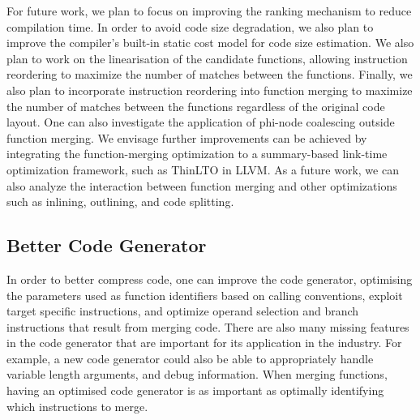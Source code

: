 For future work, we plan to focus on improving the ranking mechanism to reduce compilation time.
In order to avoid code size degradation, we also plan to improve the compiler's built-in static cost model for code size estimation.
We also plan to work on the linearisation of the candidate functions, allowing instruction reordering to maximize the number of matches between the functions.
Finally, we also plan to incorporate instruction reordering into function merging to maximize the number of matches between the functions regardless of the original code layout.
One can also investigate the application of phi-node coalescing outside function merging.
We envisage further improvements can be achieved by integrating the function-merging optimization to a summary-based  link-time optimization framework, such as ThinLTO in LLVM.
As a future work, we can also analyze the interaction between function merging and other optimizations such as inlining, outlining, and code splitting.

\subsection{Better Code Generator}


In order to better compress code, one can improve the code generator, optimising the parameters used as function identifiers based on calling conventions, exploit target specific instructions, and optimize operand selection and branch instructions that result from merging code.
There are also many missing features in the code generator that are important for its application in the industry.
For example, a new code generator could also be able to appropriately handle variable length arguments, and debug information.
When merging functions, having an optimised code generator is as important as optimally identifying which instructions to merge.

